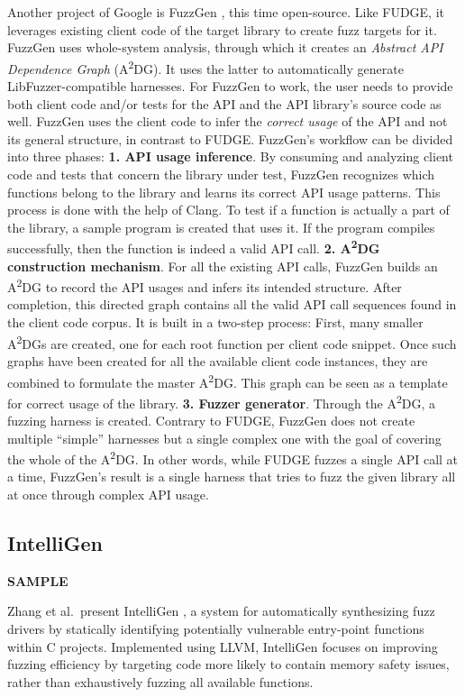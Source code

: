 \documentclass[
  a4paper,
  DIV=11,
  numbers=noendperiod]{scrreprt}
\theoremstyle{definition}
\theoremstyle{remark}
\begin{document}
Another project of Google is FuzzGen \autocite{fuzzgen}, this time
open-source. Like FUDGE, it leverages existing client code of the target
library to create fuzz targets for it. FuzzGen uses whole-system
analysis, through which it creates an \emph{Abstract API Dependence
Graph} (A\textsuperscript{2}DG). It uses the latter to automatically
generate LibFuzzer-compatible harnesses. For FuzzGen to work, the user
needs to provide both client code and/or tests for the API and the API
library's source code as well. FuzzGen uses the client code to infer the
\emph{correct usage} of the API and not its general structure, in
contrast to FUDGE. FuzzGen's workflow can be divided into three phases:
\textbf{1. API usage inference}. By consuming and analyzing client code
and tests that concern the library under test, FuzzGen recognizes which
functions belong to the library and learns its correct API usage
patterns. This process is done with the help of Clang. To test if a
function is actually a part of the library, a sample program is created
that uses it. If the program compiles successfully, then the function is
indeed a valid API call. \textbf{2. A\textsuperscript{2}DG construction
mechanism}. For all the existing API calls, FuzzGen builds an
A\textsuperscript{2}DG to record the API usages and infers its intended
structure. After completion, this directed graph contains all the valid
API call sequences found in the client code corpus. It is built in a
two-step process: First, many smaller A\textsuperscript{2}DGs are
created, one for each root function per client code snippet. Once such
graphs have been created for all the available client code instances,
they are combined to formulate the master A\textsuperscript{2}DG. This
graph can be seen as a template for correct usage of the library.
\textbf{3. Fuzzer generator}. Through the A\textsuperscript{2}DG, a
fuzzing harness is created. Contrary to FUDGE, FuzzGen does not create
multiple ``simple'' harnesses but a single complex one with the goal of
covering the whole of the A\textsuperscript{2}DG. In other words, while
FUDGE fuzzes a single API call at a time, FuzzGen's result is a single
harness that tries to fuzz the given library all at once through complex
API usage.

\subsection{IntelliGen}\label{intelligen}

\textbf{SAMPLE}

Zhang et al.~present IntelliGen \autocite{zhang2021}, a system for
automatically synthesizing fuzz drivers by statically identifying
potentially vulnerable entry-point functions within C projects.
Implemented using LLVM, IntelliGen focuses on improving fuzzing
efficiency by targeting code more likely to contain memory safety
issues, rather than exhaustively fuzzing all available functions.
\end{document}
